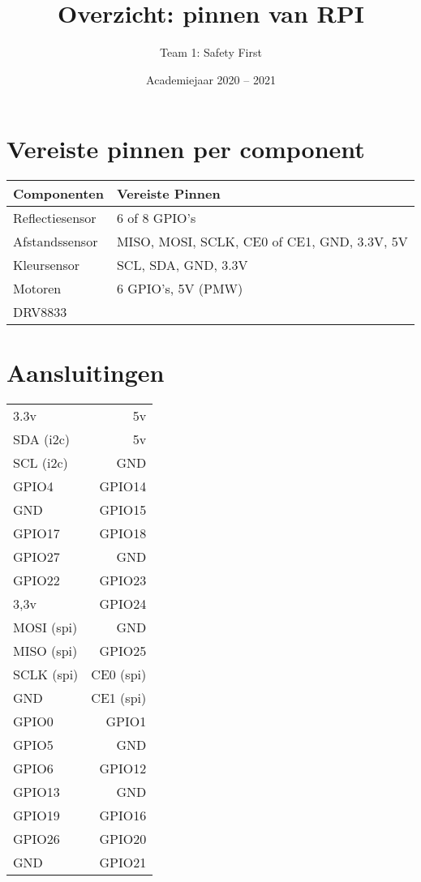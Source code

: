 \documentclass[a4paper,kulak]{kulakarticle} %
\date{Academiejaar 2020 -- 2021}
\title{Overzicht: pinnen van RPI}
\author{Team 1: Safety First}
\begin{document}
\maketitle


\section*{Vereiste pinnen per component}
\begin{center}

\begin{tabular}{l|l}
	Componenten     & Vereiste Pinnen                             \\ 
	\hline
	Reflectiesensor & 6 of 8 GPIO's                               \\
	Afstandssensor  & MISO, MOSI, SCLK, CE0 of CE1, GND, 3.3V, 5V \\
	Kleursensor     & SCL, SDA, GND, 3.3V                         \\
	Motoren         & 6 GPIO's, 5V (PMW)						\\
	DRV8833 & 
\end{tabular}

\end{center}

\section*{Aansluitingen}

\begin{center}

\begin{tabular}{l|r}
	3.3v       &        5v \\
	SDA (i2c)  &        5v \\
	SCL (i2c)  &       GND \\
	GPIO4      &    GPIO14 \\
	GND        &    GPIO15 \\
	GPIO17     &    GPIO18 \\
	GPIO27     &       GND \\
	GPIO22     &    GPIO23 \\
	3,3v       &    GPIO24 \\
	MOSI (spi) &       GND \\
	MISO (spi) &    GPIO25 \\
	SCLK (spi) & CE0 (spi) \\
	GND        & CE1 (spi) \\
	GPIO0      &     GPIO1 \\
	GPIO5      &       GND \\
	GPIO6      &    GPIO12 \\
	GPIO13     &       GND \\
	GPIO19     &    GPIO16 \\
	GPIO26     &    GPIO20 \\
	GND        &    GPIO21
\end{tabular}

\end{center}
\end{document}

